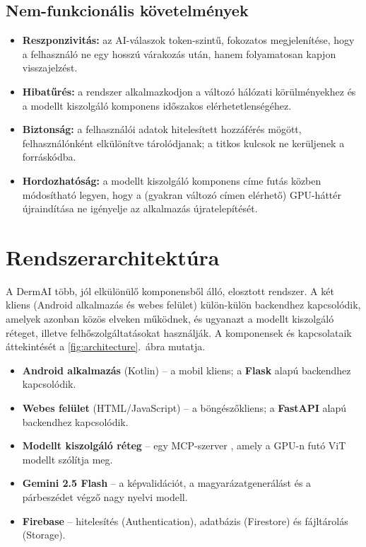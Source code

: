 \subsection{Nem-funkcionális követelmények}

\begin{itemize}
  \item \textbf{Reszponzivitás:} az AI-válaszok token-szintű, fokozatos
  megjelenítése, hogy a felhasználó ne egy hosszú várakozás után, hanem
  folyamatosan kapjon visszajelzést.
  \item \textbf{Hibatűrés:} a rendszer alkalmazkodjon a változó hálózati
  körülményekhez és a modellt kiszolgáló komponens időszakos
  elérhetetlenségéhez.
  \item \textbf{Biztonság:} a felhasználói adatok hitelesített hozzáférés mögött,
  felhasználónként elkülönítve tárolódjanak; a titkos kulcsok ne kerüljenek a
  forráskódba.
  \item \textbf{Hordozhatóság:} a modellt kiszolgáló komponens címe futás közben
  módosítható legyen, hogy a (gyakran változó címen elérhető) GPU-háttér
  újraindítása ne igényelje az alkalmazás újratelepítését.
\end{itemize}

\section{Rendszerarchitektúra}

A DermAI több, jól elkülönülő komponensből álló, elosztott rendszer. A két
kliens (Android alkalmazás és webes felület) külön-külön backendhez kapcsolódik,
amelyek azonban közös elveken működnek, és ugyanazt a modellt kiszolgáló réteget,
illetve felhőszolgáltatásokat használják. A komponensek és kapcsolataik
áttekintését a \ref{fig:architecture}.~ábra mutatja.

\begin{itemize}
  \item \textbf{Android alkalmazás} (Kotlin) -- a mobil kliens; a
  \textbf{Flask} alapú backendhez \cite{flask} kapcsolódik.
  \item \textbf{Webes felület} (HTML/JavaScript) -- a böngészőkliens; a
  \textbf{FastAPI} alapú backendhez \cite{fastapi} kapcsolódik.
  \item \textbf{Modellt kiszolgáló réteg} -- egy MCP-szerver
  \cite{mcp2024}, amely a GPU-n futó ViT modellt szólítja meg.
  \item \textbf{Gemini 2.5 Flash} \cite{gemini2023} -- a képvalidációt, a
  magyarázatgenerálást és a párbeszédet végző nagy nyelvi modell.
  \item \textbf{Firebase} \cite{firebase} -- hitelesítés (Authentication),
  adatbázis (Firestore) és fájltárolás (Storage).
\end{itemize}

